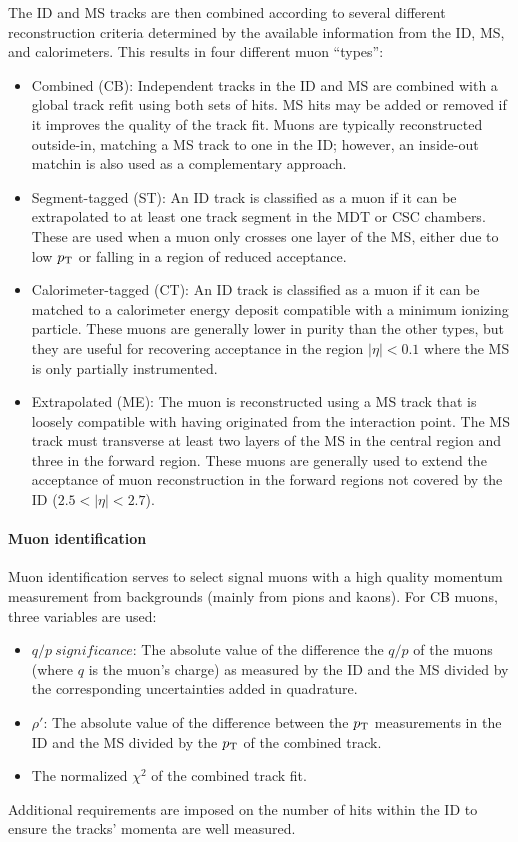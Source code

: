 The ID and MS tracks are then combined according to several different reconstruction criteria determined by the available information from the ID, MS, and calorimeters.
This results in four different muon ``types'':
\begin{itemize}
  \item Combined (CB): Independent tracks in the ID and MS are combined with a global track refit using both sets of hits.
MS hits may be added or removed if it improves the quality of the track fit.
Muons are typically reconstructed outside-in, matching a MS track to one in the ID; however, an inside-out matchin is also used as a complementary approach.
  \item Segment-tagged (ST): An ID track is classified as a muon if it can be extrapolated to at least one track segment in the MDT or CSC chambers.
These are used when a muon only crosses one layer of the MS, either due to low $p_{\mathrm{T}}$ or falling in a region of reduced acceptance.
  \item Calorimeter-tagged (CT): An ID track is classified as a muon if it can be matched to a calorimeter energy deposit compatible with a minimum ionizing particle.
These muons are generally lower in purity than the other types, but they are useful for recovering acceptance in the region $|\eta| < 0.1$ where the MS is only partially instrumented.
  \item Extrapolated (ME): The muon is reconstructed using a MS track that is loosely compatible with having originated from the interaction point.
The MS track must transverse at least two layers of the MS in the central region and three in the forward region.
These muons are generally used to extend the acceptance of muon reconstruction in the forward regions not covered by the ID ($2.5 < |\eta| < 2.7$).
\end{itemize}

\paragraph*{Muon identification}
Muon identification serves to select signal muons with a high quality momentum measurement from backgrounds (mainly from pions and kaons).
For CB muons, three variables are used:
\begin{itemize}
  \item $q/p\ significance$: The absolute value of the difference the $q/p$ of the muons (where $q$ is the muon's charge) as measured by the ID and the MS divided by the corresponding uncertainties added in quadrature.
  \item $\rho'$: The absolute value of the difference between the $p_{\mathrm{T}}$ measurements in the ID and the MS divided by the $p_{\mathrm{T}}$ of the combined track.
  \item The normalized $\chi^2$ of the combined track fit.
\end{itemize}
Additional requirements are imposed on the number of hits within the ID to ensure the tracks' momenta are well measured.

